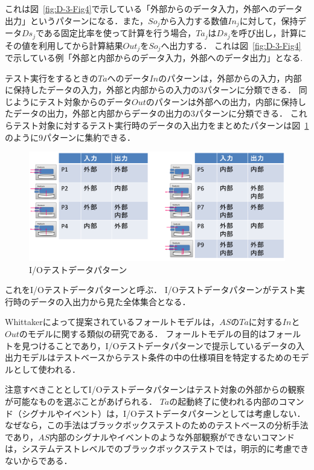 これは図~\ref{fig:D-3-Fig4}で示している「外部からのデータ入力，外部へのデータ出力」というパターンになる．また，$So_j$から入力する数値$In_j$に対して，保持データ$Ds_j$である固定比率を使って計算を行う場合，$Ta_j$は$Ds_j$を呼び出し，計算にその値を利用してから計算結果$Out_j$を$So_j$へ出力する．
これは図~\ref{fig:D-3-Fig4}で示している例「外部と内部からのデータ入力，外部へのデータ出力」となる.

テスト実行をするときの$Ta$へのデータ$In$のパターンは，外部からの入力，内部に保持したデータの入力，外部と内部からの入力の3パターンに分類できる．
同じようにテスト対象からのデータ$Out$のパターンは外部への出力，内部に保持したデータの出力，外部と内部からデータの出力の3パターンに分類できる．
これらテスト対象に対するテスト実行時のデータの入出力をまとめたパターンは図~\ref{fig:D-4-Fig6}のように9パターンに集約できる．

\begin{figure}[htbp]
\begin{center}
\includegraphics[width=14cm]{./image/D-3-Fig5.png}
\caption{I/Oテストデータパターン}
\label{fig:D-4-Fig6}
\end{center}
\end{figure}

これをI/Oテストデータパターンと呼ぶ\cite{yumoto2015IPA}．
I/Oテストデータパターンがテスト実行時のデータの入出力から見た全体集合となる．

Whittakerによって提案されているフォールトモデル\cite{whittaker2003break}は，$AS$の$Ta$に対する$In$と$Out$のモデルに関する類似の研究である．
フォールトモデルの目的はフォールトを見つけることであり，I/Oテストデータパターンで提示しているデータの入出力モデルはテストベースからテスト条件の中の仕様項目を特定するためのモデルとして使われる．

注意すべきこととしてI/Oテストデータパターンはテスト対象の外部からの観察が可能なものを選ぶことがあげられる．
$Ta$の起動終了に使われる内部のコマンド（シグナルやイベント）は，I/Oテストデータパターンとしては考慮しない．
なぜなら，この手法はブラックボックステストのためのテストベースの分析手法であり，$AS$内部のシグナルやイベントのような外部観察ができないコマンドは，システムテストレベルでのブラックボックステストでは，明示的に考慮できないからである．


